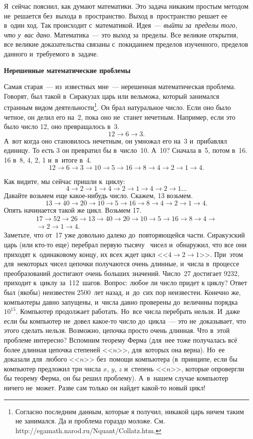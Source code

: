 Я~сейчас пояснил, как думают математики. Это задача никаким простым методом не~решается без~выхода
в~пространство. Выход в~пространство решает ее в~один ход. Так происходит с~математикой.
Идея~--- \textit{выйти за~пределы того, что у~вас дано}. Математика~--- это выход за~пределы. Все великие
открытия, все великие доказательства связаны с~покиданием пределов изученного, пределов данного
и~требуемого в~задаче.

\textbf{Нерешенные математические проблемы}

Самая старая~--- из~известных мне~--- нерешенная математическая проблема. Говорят, был такой
в~Сиракузах царь или вельможа, который занимался странным видом
деятельности\footnote{Согласно последним данным, которые я получил, никакой царь ничем таким не занимался.
Да и проблема гораздо моложе.  См. http://egamath.narod.ru/Nquant/Collatz.htm.}.
 Он брал натуральное
число. Если оно было четное, он делил его на~2, пока оно не~станет нечетным. Например, если это
было число 12, оно превращалось в~3.
$$
12\to 6\to 3.
$$
А~вот когда оно становилось нечетным, он умножал его на~3 и~прибавлял единицу. То есть 3 он
превратил бы в~число~10. А~10? Сначала в~5, потом в~16. 16 в~8, 4, 2, 1 и~в~итоге в~4.
$$
12\to 6\to 3\to 10\to 5\to 16\to 8\to 4\to 2\to 1\to 4.
$$

Как видите, мы сейчас пришли к~циклу:
$$
4\to2\to1\to4\to2\to1\to4\to2\to1\ldots
$$
Давайте возьмем еще какое-нибудь число. Скажем, 13 возьмем.
$$
13\to40\to20\to10\to5\to16\to8\to4\to2\to1\to4.
$$
Опять начинается такой же цикл. Возьмем 17.
\begin{multline*}
17\to52\to26\to13\to40\to20\to10\to5\to16\to8\to4
\to\\\to
2\to1\to4.
\end{multline*}
Заметьте, что от~17 уже довольно далеко до~повторяющейся части. Сиракузский царь (или кто-то еще)
перебрал первую тысячу ~чисел и~обнаружил, что все они приходят к~одинаковому концу, их всех ждет цикл <<$4\to2\to1$>>.
При~этом для~некоторых чисел цепочки получаются очень длинные, и~числа в~процессе преобразований
достигают очень больших значений. Число~27 достигает 9232, приходит к~циклу за~112~шагов. Вопрос:
любое ли число придет к циклу? Ответ был (якобы) неизвестен 2500~лет назад, и~до~сих пор неизвестен. Конечно
же, компьютеры давно запущены, и~числа давно проверены до~величины порядка~$10^{15}$. Компьютер
продолжает работать. Но~все числа перебрать нельзя. И~даже если бы компьютер не~довел какое-то
число до~цикла~--- это не~доказывает, что этого сделать нельзя. Возможно, цепочка просто очень
длинная. Что в~этой проблеме интересно? Вспомним теорему Ферма (для~нее тоже получалась всё более
длинная цепочка степеней <<$n$>>, для~которых она верна). Но~ее доказали для~любого <<$n$>> без~помощи
компьютера (в~принципе, если бы компьютер предложил три числа $x$, $y$, $z$ и~степень <<$n$>>, которые
опровергли бы теорему Ферма, он бы решил проблему). А~в~нашем случае компьютер ничего не~может. Разве сам только он найдет какой-то новый цикл!

